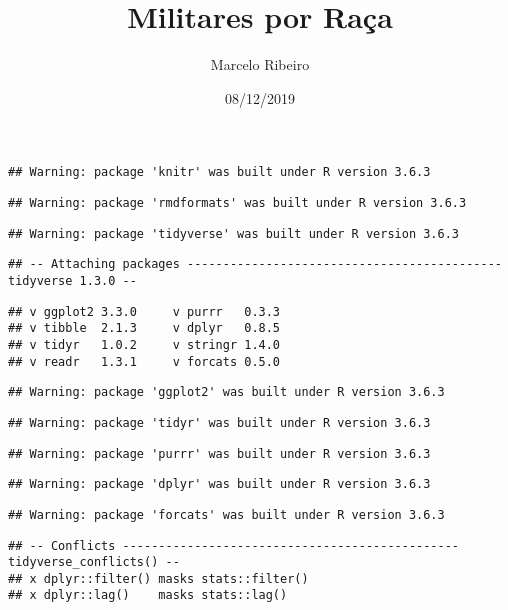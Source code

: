 \documentclass[
]{article}
\title{Militares por Raça}
\author{Marcelo Ribeiro}
\date{08/12/2019}
\begin{document}
\maketitle

\begin{verbatim}
## Warning: package 'knitr' was built under R version 3.6.3
\end{verbatim}

\begin{verbatim}
## Warning: package 'rmdformats' was built under R version 3.6.3
\end{verbatim}

\begin{verbatim}
## Warning: package 'tidyverse' was built under R version 3.6.3
\end{verbatim}

\begin{verbatim}
## -- Attaching packages -------------------------------------------- tidyverse 1.3.0 --
\end{verbatim}

\begin{verbatim}
## v ggplot2 3.3.0     v purrr   0.3.3
## v tibble  2.1.3     v dplyr   0.8.5
## v tidyr   1.0.2     v stringr 1.4.0
## v readr   1.3.1     v forcats 0.5.0
\end{verbatim}

\begin{verbatim}
## Warning: package 'ggplot2' was built under R version 3.6.3
\end{verbatim}

\begin{verbatim}
## Warning: package 'tidyr' was built under R version 3.6.3
\end{verbatim}

\begin{verbatim}
## Warning: package 'purrr' was built under R version 3.6.3
\end{verbatim}

\begin{verbatim}
## Warning: package 'dplyr' was built under R version 3.6.3
\end{verbatim}

\begin{verbatim}
## Warning: package 'forcats' was built under R version 3.6.3
\end{verbatim}

\begin{verbatim}
## -- Conflicts ----------------------------------------------- tidyverse_conflicts() --
## x dplyr::filter() masks stats::filter()
## x dplyr::lag()    masks stats::lag()
\end{verbatim}
\end{document}

